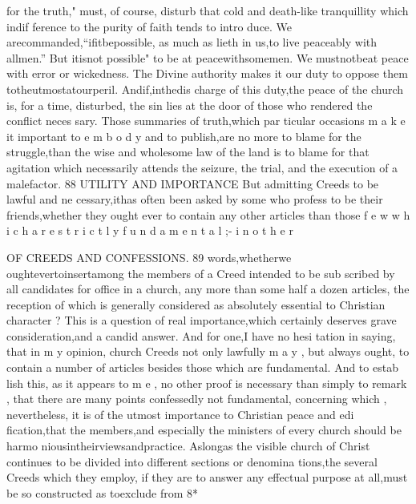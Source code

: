 \documentclass[
]{book}
\begin{document}
for the truth," must, of course, disturb that cold and death-like tranquillity which indif
ference to the purity of faith tends to intro
duce. We arecommanded,``ifitbepossible,
as much as lieth in us,to live peaceably with
allmen.'' But itisnot possible" to be at peacewithsomemen. We mustnotbeat
peace with error or wickedness. The Divine authority makes it our duty to oppose them
totheutmostatourperil. Andif,inthedis charge of this duty,the peace of the church is, for a time, disturbed, the sin lies at the door of those who rendered the conflict neces sary. Those summaries of truth,which par ticular occasions m a k e it important to e m b o d y and to publish,are no more to blame for the struggle,than the wise and wholesome law of
the land is to blame for that agitation which
necessarily attends the seizure, the trial, and the execution of a malefactor.
88 UTILITY AND IMPORTANCE
But admitting Creeds to be lawful and ne cessary,ithas often been asked by some who profess to be their friends,whether they ought ever to contain any other articles than those f e w w h i c h a r e s t r i c t l y f u n d a m e n t a l ;- i n o t h e r

OF CREEDS AND CONFESSIONS. 89
words,whetherwe oughtevertoinsertamong the members of a Creed intended to be sub
scribed by all candidates for office in a church, any more than some half a dozen articles, the reception of which is generally considered as absolutely essential to Christian character ?
This is a question of real importance,which
certainly deserves grave consideration,and a candid answer. And for one,I have no hesi
tation in saying, that in m y opinion, church Creeds not only lawfully m a y , but always ought, to contain a number of articles besides those which are fundamental. And to estab
lish this, as it appears to m e , no other proof is necessary than simply to remark , that there
are many points confessedly not fundamental,
concerning which , nevertheless, it is of the
utmost importance to Christian peace and edi
fication,that the members,and especially the ministers of every church should be harmo
niousintheirviewsandpractice. Aslongas the visible church of Christ continues to be
divided into different sections or denomina
tions,the several Creeds which they employ, if they are to answer any effectual purpose at all,must be so constructed as toexclude from
8*
\end{document}
